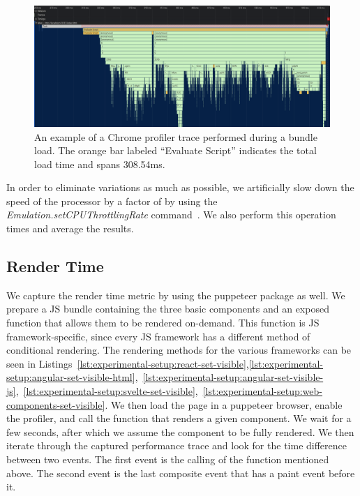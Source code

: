 \begin{figure}[h]
	\includegraphics[width=\columnwidth]{figures/experimental-setup/load-time.png}
	\caption{An example of a Chrome profiler trace performed during a bundle load. The orange bar labeled ``Evaluate Script'' indicates the total load time and spans 308.54ms.}
	\label{fig:experimental-setup:load-time}
	\centering
\end{figure}

In order to eliminate variations as much as possible, we artificially slow down the speed of the processor by a factor of \slowdownFactorLoadTime{} by using the \emph{Emulation.setCPUThrottlingRate} command~. We also perform this operation \loadTimePerformanceMeasures{} times and average the results.

\subsection{Render Time}
We capture the render time metric by using the puppeteer package as well. We prepare a JS bundle containing the three basic components and an exposed function that allows them to be rendered on-demand. This function is JS framework-specific, since every JS framework has a different method of conditional rendering. The rendering methods for the various frameworks can be seen in Listings~\ref{lst:experimental-setup:react-set-visible},\ref{lst:experimental-setup:angular-set-visible-html},~\ref{lst:experimental-setup:angular-set-visible-js},~\ref{lst:experimental-setup:svelte-set-visible},~\ref{lst:experimental-setup:web-components-set-visible}. We then load the page in a puppeteer browser, enable the profiler, and call the function that renders a given component. We wait for a few seconds, after which we assume the component to be fully rendered. We then iterate through the captured performance trace and look for the time difference between two events. The first event is the calling of the function mentioned above. The second event is the last composite event that has a paint event before it.

